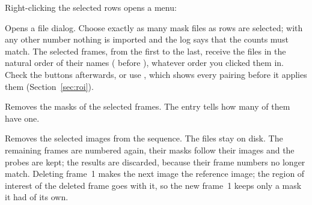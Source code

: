 Right-clicking the selected rows opens a menu:
\begin{description}[leftmargin=1.2cm,style=nextline]
  \item[Import Region of Interest for $n$ frame(s)] Opens a file dialog. Choose exactly as many
    mask files as rows are selected; with any other number nothing is imported and the log says
    that the counts must match. The selected frames, from the first to the last, receive the
    files in the natural order of their names ( before ),
    whatever order you clicked them in. Check the  buttons afterwards, or use , which shows every
    pairing before it applies them (Section~\ref{sec:roi}).
  \item[Clear Region of Interest] Removes the masks of the selected frames. The entry tells how
    many of them have one.
  \item[Delete $n$ image(s)] Removes the selected images from the sequence. The files stay on
    disk. The remaining frames are numbered again, their masks follow their images and the
    probes are kept; the results are discarded, because their frame numbers no longer match.
    Deleting frame~1 makes the next image the reference image; the region of interest of the
    deleted frame goes with it, so the new frame~1 keeps only a mask it had of its own.
\end{description}
